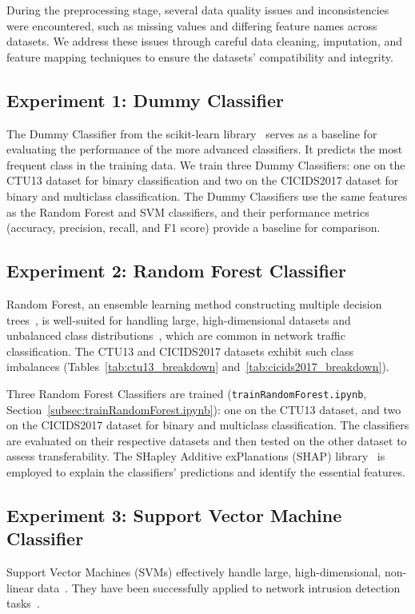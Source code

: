 During the preprocessing stage, several data quality issues and inconsistencies were encountered, such as missing values and differing feature names across datasets. We address these issues through careful data cleaning, imputation, and feature mapping techniques to ensure the datasets' compatibility and integrity.

\subsection{Experiment 1: Dummy Classifier}\label{subsec:baseline-performance}
The Dummy Classifier from the scikit-learn library~\cite{pedregosa2011scikit} serves as a baseline for evaluating the performance of the more advanced classifiers. It predicts the most frequent class in the training data. We train three Dummy Classifiers: one on the CTU13 dataset for binary classification and two on the CICIDS2017 dataset for binary and multiclass classification. The Dummy Classifiers use the same features as the Random Forest and SVM classifiers, and their performance metrics (accuracy, precision, recall, and F1 score) provide a baseline for comparison.

\subsection{Experiment 2: Random Forest Classifier}\label{subsec:random-forest-classifier}
Random Forest, an ensemble learning method constructing multiple decision trees~\cite{hastie2009random}, is well-suited for handling large, high-dimensional datasets and unbalanced class distributions~\cite{farnaaz2016random}, which are common in network traffic classification. The CTU13 and CICIDS2017 datasets exhibit such class imbalances (Tables~\ref{tab:ctu13_breakdown} and~\ref{tab:cicids2017_breakdown}).

Three Random Forest Classifiers are trained (\texttt{trainRandomForest.ipynb}, Section~\ref{subsec:trainRandomForest.ipynb}): one on the CTU13 dataset, and two on the CICIDS2017 dataset for binary and multiclass classification. The classifiers are evaluated on their respective datasets and then tested on the other dataset to assess transferability. The SHapley Additive exPlanations (SHAP) library~\cite{lundberg2017unified} is employed to explain the classifiers' predictions and identify the essential features.

\subsection{Experiment 3: Support Vector Machine Classifier}\label{subsec:support-vector-machine-classifier}
Support Vector Machines (SVMs) effectively handle large, high-dimensional, non-linear data~\cite{cortes1995support, scholkopf2002learning}. They have been successfully applied to network intrusion detection tasks~\cite{kim2003network, teng2017svm}.

